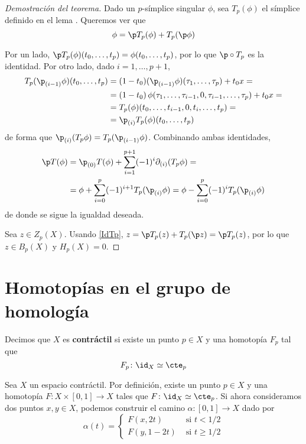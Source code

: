 \begin{proof}[Demostración del teorema]
	Dado un $p$-símplice singular $\phi$, sea $T_p(\phi)$ el símplice definido en el lema .
	Queremos ver que
	\begin{equation}
		\phi=\p T_p(\phi)+T_p(\p \phi) \label{IdTp}
	\end{equation}

	Por un lado, $\p T_p(\phi)(t_0,\dots,t_p)=\phi(t_0,\dots,t_p)$, por lo que $\p\circ T_p$ es la identidad.
	Por otro lado, dado $i=1,\dots,p+1$,
	\begin{align*}
	T_p(\p_{(i-1)}\phi)(t_0,\dots,t_p)
		&=(1-t_0)(\p_{(i-1)}\phi)(\tau_1,\dots,\tau_p)+t_0x=\\
		&=(1-t_0)\,\phi(\tau_1,\dots,\tau_{i-1},0,\tau_{i-1},\dots,\tau_p)+t_0x=\\
		&=T_p(\phi)(t_0,\dots,t_{i-1},0,t_i,\dots,t_p)=\\
		&=\p_{(i)}T_p(\phi)(t_0,\dots,t_p)
	\end{align*}
	de forma que $\p_{(i)}(T_p\phi)=T_p(\p_{(i-1)}\phi)$.
	Combinando ambas identidades,
	\begin{align*}
	\p T(\phi)
		&=\p_{(0)}T(\phi)+\sum^{p+1}_{i=1}(-1)^i\partial_{(i)}(T_p\phi)=\\
		&=\phi+\sum^p_{i=0}(-1)^{i+1}T_p(\p_{(i)}\phi)=\phi-\sum^p_{i=0}(-1)^iT_p(\p_{(i)}\phi)
	\end{align*}
	de donde se sigue la igualdad deseada.

	Sea $z \in Z_p(X)$.
	Usando \eqref{IdTp}, $z=\p T_p(z)+T_p(\p z)=\p T_p(z)$, por lo que $z \in B_p(X)$ y $H_p(X)=0$.
\end{proof}

\section{Homotopías en el grupo de homología}
\begin{definition}
	Decimos que $X$ es \textbf{contráctil} si existe un punto $p \in X$ y una homotopía $F_p$ tal que
		\[F_p\colon \id_X \simeq \cte_p\]
\end{definition}

Sea $X$ un espacio contráctil. Por definición, existe un punto $p \in X$ y una
homotopía $F\colon X \times [0,1] \to X$ tales que $F\colon \id_X \simeq
\cte_p$. Si ahora consideramos dos puntos $x,y \in X$, podemos construir el
camino $\alpha\colon [0,1] \to X$ dado por
\[\alpha(t)=
\begin{cases}
F(x,2t) & \text{ si $t < 1/2$}\\
F(y,1-2t) & \text{ si $t \geq 1/2$}
\end{cases}\]

